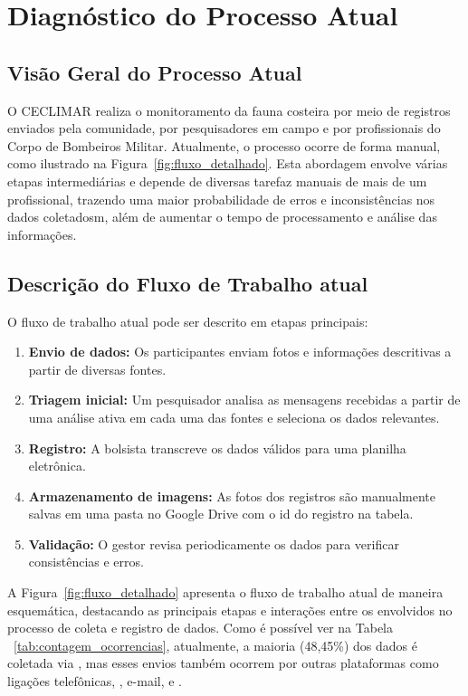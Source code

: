 \chapter{Diagnóstico do Processo Atual} \label{chapter:diagnostico}

\section{Visão Geral do Processo Atual}

O CECLIMAR realiza o monitoramento da fauna costeira por meio de registros enviados pela comunidade, 
por pesquisadores em campo e por profissionais do Corpo de Bombeiros Militar. Atualmente, o processo 
ocorre de forma manual, como ilustrado na Figura~\ref{fig:fluxo_detalhado}. Esta abordagem envolve 
várias etapas intermediárias e depende de diversas tarefaz manuais de mais de um profissional, trazendo
uma maior probabilidade de erros e inconsistências nos dados coletadosm, além de aumentar o tempo
de processamento e análise das informações.

\section{Descrição do Fluxo de Trabalho atual}

O fluxo de trabalho atual pode ser descrito em etapas principais:

\begin{enumerate}
    \item \textbf{Envio de dados:} Os participantes enviam fotos e informações descritivas a partir de diversas fontes.
    \item \textbf{Triagem inicial:} Um pesquisador analisa as mensagens recebidas a partir de uma análise ativa em cada uma das fontes e seleciona os dados relevantes.
    \item \textbf{Registro:} A bolsista transcreve os dados válidos para uma planilha eletrônica.
    \item \textbf{Armazenamento de imagens:} As fotos dos registros são manualmente salvas em uma pasta no Google Drive com o id do registro na tabela.
    \item \textbf{Validação:} O gestor revisa periodicamente os dados para verificar consistências e erros.
\end{enumerate}

A Figura~\ref{fig:fluxo_detalhado} apresenta o fluxo de trabalho atual de maneira esquemática, 
destacando as principais etapas e interações entre os envolvidos no processo de coleta e registro de dados.
Como é possível ver na Tabela ~\ref{tab:contagem_ocorrencias}, atualmente, a maioria (48,45\%) dos dados 
é coletada via , mas esses envios também ocorrem por outras plataformas 
como ligações telefônicas, , e-mail, e .

